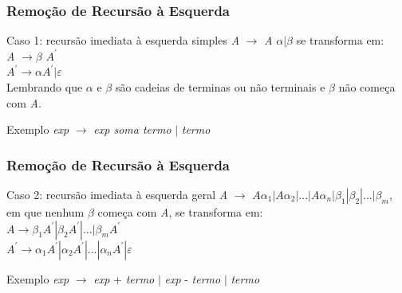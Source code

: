 \documentclass[table]{beamer}
\begin{document}
\begin{frame}
   \frametitle{Remoção de Recursão à Esquerda}
   \begin{block}{Caso 1: recursão imediata à esquerda simples}
   \textit{A} $\to$ \textit{A} $\alpha|\beta$ se transforma em: \\
   \textit{A} $\to \beta$ $\textit{A}^{'}$ \\
   $\textit{A}^{'} \to \alpha \textit{A}^{'} | \varepsilon$ \\
   Lembrando que $\alpha$ e $\beta$ são cadeias de terminas ou não terminais e $\beta$ não começa com \textit{A}.
   \end{block}
   \begin{block}{Exemplo}
   \textit{exp} $\to$ \textit{exp soma termo} $|$ \textit{termo}
   \end{block}
\end{frame}

\begin{frame}
   \frametitle{Remoção de Recursão à Esquerda}
   \begin{block}{Caso 2: recursão imediata à esquerda geral}
   \textit{A} $\to$ $\textit{A}\alpha_{1}|\textit{A}\alpha_{2}|\text{...}|\textit{A}\alpha_{n}|\beta_{1}|\beta_{2}|\text{...}|\beta_{m}$, em que nenhum $\beta$ começa com \textit{A}, se transforma em: \\
   $\textit{A}\to \beta_{1}\textit{A}^{'}|\beta_{2}\textit{A}^{'}|\text{...}|\beta_{m}\textit{A}^{'}$\\
   $\textit{A}^{'} \to \alpha_{1}\textit{A}^{'}|\alpha_{2}\textit{A}^{'}|\text{...}|\alpha_{n}\textit{A}^{'}|\varepsilon$
   \end{block}
   \begin{block}{Exemplo}
   \textit{exp} $\to$ \textit{exp} + \textit{termo} $|$ \textit{exp} - \textit{termo} $|$ \textit{termo}
   \end{block}
\end{frame}
\end{document}
